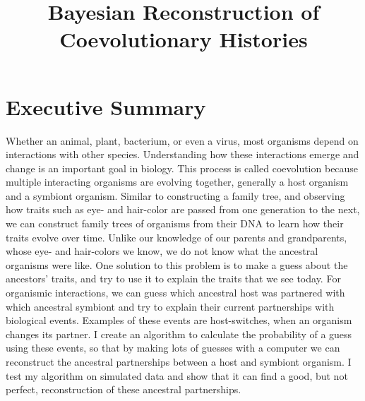 \documentclass[12pt,letterpaper]{article}
\title{Bayesian Reconstruction of Coevolutionary Histories}
\begin{document}
\maketitle
\thispagestyle{empty}

\doublespacing

\section*{Executive Summary}

Whether an animal, plant, bacterium, or even a virus, most organisms depend on interactions with other species. Understanding how these interactions emerge and change is an important goal in biology. This process is called coevolution because multiple interacting organisms are evolving together, generally a host organism and a symbiont organism. Similar to constructing a family tree, and observing how traits such as eye- and hair-color are passed from one generation to the next, we can construct family trees of organisms from their DNA to learn how their traits evolve over time. Unlike our knowledge of our parents and grandparents, whose eye- and hair-colors we know, we do not know what the ancestral organisms were like. One solution to this problem is to make a guess about the ancestors' traits, and try to use it to explain the traits that we see today. For organismic interactions, we can guess which ancestral host was partnered with which ancestral symbiont and try to explain their current partnerships with biological events. Examples of these events are host-switches, when an organism changes its partner. I create an algorithm to calculate the probability of a guess using these events, so that by making lots of guesses with a computer we can reconstruct the ancestral partnerships between a host and symbiont organism. I test my algorithm on simulated data and show that it can find a good, but not perfect, reconstruction of these ancestral partnerships.
\end{document}
